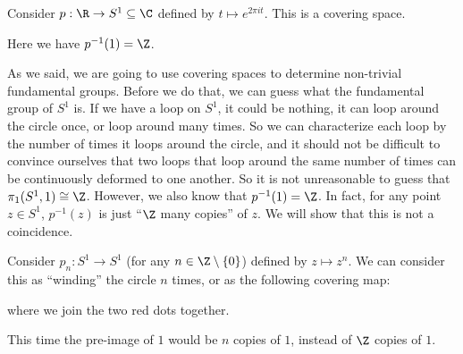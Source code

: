 \documentclass[a4paper]{article}
\begin{document}
\begin{eg}
  Consider $p: \R \to S^1\subseteq \C$ defined by $t \mapsto e^{2\pi i t}$. This is a covering space.
  \begin{center}
  \end{center}
  Here we have $p^{-1}(1) = \Z$.
\end{eg}
As we said, we are going to use covering spaces to determine non-trivial fundamental groups. Before we do that, we can guess what the fundamental group of $S^1$ is. If we have a loop on $S^1$, it could be nothing, it can loop around the circle once, or loop around many times. So we can characterize each loop by the number of times it loops around the circle, and it should not be difficult to convince ourselves that two loops that loop around the same number of times can be continuously deformed to one another. So it is not unreasonable to guess that $\pi_1(S^1, 1) \cong \Z$. However, we also know that $p^{-1}(1) = \Z$. In fact, for any point $z\in S^1$, $p^{-1}(z)$ is just ``$\Z$ many copies'' of $z$. We will show that this is not a coincidence.

\begin{eg}
  Consider $p_n: S^1 \to S^1$ (for any $n \in \Z\setminus\{0\}$) defined by $z \mapsto z^n$. We can consider this as ``winding'' the circle $n$ times, or as the following covering map:
  \begin{center}
  \end{center}
  where we join the two red dots together.

  This time the pre-image of $1$ would be $n$ copies of $1$, instead of $\Z$ copies of $1$.
\end{eg}
\end{document}
